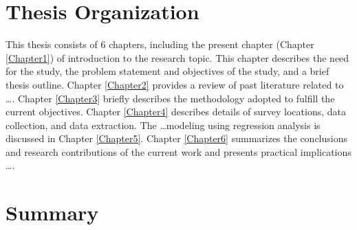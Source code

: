 \section{Thesis Organization}
This thesis consists of 6 chapters, including the present chapter (Chapter \ref{Chapter1}) of introduction to the research topic. This chapter describes the need for the study,
the problem statement and objectives of the study, and a brief thesis outline. Chapter \ref{Chapter2} provides a review of past literature related to \ldots. Chapter \ref{Chapter3} briefly describes the methodology adopted to fulfill the current objectives. Chapter \ref{Chapter4} describes details of survey locations, data collection, and data extraction. The \ldots modeling using regression analysis is discussed in Chapter \ref{Chapter5}. Chapter \ref{Chapter6} summarizes the conclusions and research contributions of the current work and presents practical implications \ldots.

\section{Summary}
\lipsum[1]\\

 